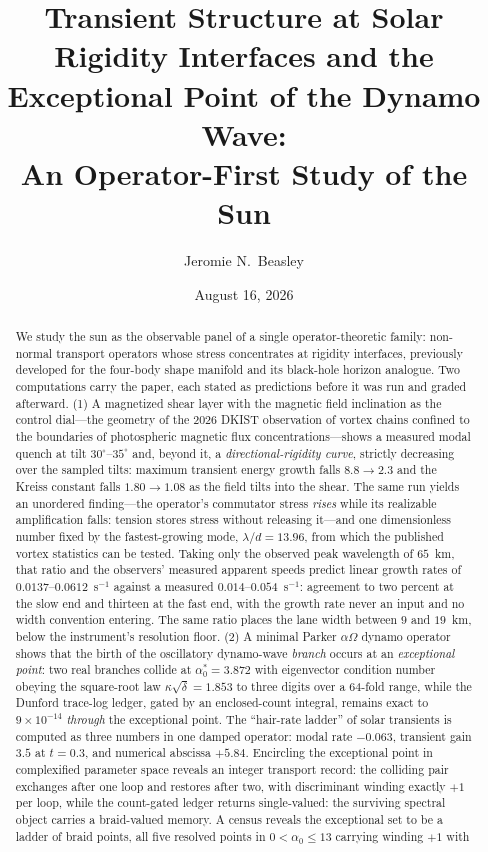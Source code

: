 \documentclass[11pt]{article}
\title{Transient Structure at Solar Rigidity Interfaces and the\\
Exceptional Point of the Dynamo Wave:\\
\large An Operator-First Study of the Sun}
\author{Jeromie N.\ Beasley}
\date{August 16, 2026}
\theoremstyle{definition}
\theoremstyle{remark}
\begin{document}
\maketitle

\begin{abstract}
We study the sun as the observable panel of a single operator-theoretic
family: non-normal transport operators whose stress concentrates at rigidity
interfaces, previously developed for the four-body shape manifold and its
black-hole horizon analogue. Two computations carry the paper, each stated as
predictions before it was run and graded afterward. (1) A magnetized shear
layer with the magnetic field inclination as the control dial---the geometry
of the 2026 DKIST observation of vortex chains confined to the boundaries of
photospheric magnetic flux concentrations---shows a measured modal quench at
tilt $30^\circ$--$35^\circ$ and, beyond it, a \emph{directional-rigidity curve}, strictly decreasing over the sampled
tilts: maximum transient energy growth falls
$8.8\to2.3$ and the Kreiss constant falls $1.80\to1.08$ as the field tilts
into the shear. The same run yields an unordered finding---the operator's
commutator stress \emph{rises} while its realizable amplification falls:
tension stores stress without releasing it---and one dimensionless number
fixed by the fastest-growing mode, $\lambda/d=13.96$, from which the
published vortex statistics can be tested. Taking only the observed peak
wavelength of $65$~km, that ratio and the observers' measured apparent speeds
predict linear growth rates of $0.0137$--$0.0612$~s$^{-1}$ against a measured
$0.014$--$0.054$~s$^{-1}$: agreement to two percent at the slow end and
thirteen at the fast end, with the growth rate never an input and no width
convention entering. The same ratio places the lane width between $9$ and
$19$~km, below the instrument's resolution floor.
(2) A minimal Parker $\alpha\Omega$ dynamo operator shows that the birth of
the oscillatory dynamo-wave \emph{branch} occurs at an \emph{exceptional
point}: two real branches collide at
$\alpha_0^*=3.872$ with eigenvector condition number obeying the square-root
law $\kappa\sqrt{\delta}=1.853$ to three digits over a 64-fold range, while
the Dunford trace-log ledger, gated by an enclosed-count integral, remains
exact to $9\times10^{-14}$ \emph{through} the exceptional point. The
``hair-rate ladder'' of solar transients is computed as three numbers in one
damped operator: modal rate $-0.063$, transient gain $3.5$ at $t=0.3$, and
numerical abscissa $+5.84$. Encircling the exceptional point in complexified parameter space reveals an integer transport record: the colliding pair exchanges after one loop and restores after two, with discriminant winding exactly $+1$ per loop, while the count-gated ledger returns single-valued: the surviving spectral object carries a braid-valued memory. A census reveals the exceptional set to be a ladder of braid points, all five resolved points in $0<\alpha_0\le13$ carrying winding $+1$ with

\end{abstract}
\end{document}
